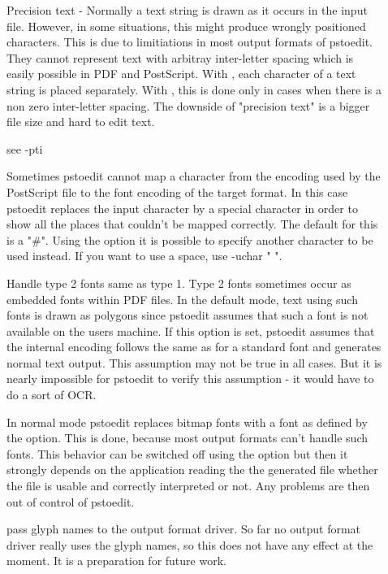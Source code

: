 \documentclass[english,a4paper]{article}
\begin{document}
\begin{description}
\item[] 
Precision text - Normally a text string is drawn as it occurs in the input file. However, in some situations, this might produce wrongly positioned characters. This is due to limitiations in most output formats of pstoedit. They cannot represent text with arbitray inter-letter spacing which is easily possible in PDF and PostScript. With , each character of a text string is placed separately. With , this is done only in cases when there is a non zero inter-letter spacing. The downside of "precision text" is a bigger file size and hard to edit text.


\item[] 
see -pti


\item[] 
Sometimes pstoedit cannot map a character from the encoding used by the PostScript file to the font encoding of the target format. In this case pstoedit replaces the input character by a special character in order to show all the places that couldn't be mapped correctly. The default for this is a "\#". Using the  option it is possible to specify another character to be used instead. If you want to use a space, use -uchar " ".


\item[] 
Handle type 2 fonts same as type 1. Type 2 fonts sometimes occur as embedded fonts within PDF files. In the default mode, text using such fonts is drawn as polygons since pstoedit assumes that such a font is not available on the users machine. If this option is set, pstoedit assumes that the internal encoding follows the same as for a standard font and generates normal text output. This assumption may not be true in all cases. But it is nearly impossible for pstoedit to verify this assumption - it would have to do a sort of OCR.


\item[] 
In normal mode pstoedit replaces bitmap fonts with a font as defined by the  option. This is done, because most output formats can't handle such fonts. This behavior can be switched off using the  option but then it strongly depends on the application reading the the generated file whether the file is usable and correctly interpreted or not. Any problems are then out of control of pstoedit.


\item[] 
pass glyph names to the output format driver. So far no output format driver really uses the glyph names, so this does not have any effect at the moment. It is a preparation for future work.



\end{description}
\end{document}
